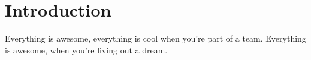 \chapter{Introduction}
\label{cha:introduction}
Everything is awesome, everything is cool when you're part of a team.
Everything is awesome, when you're living out a dream.
